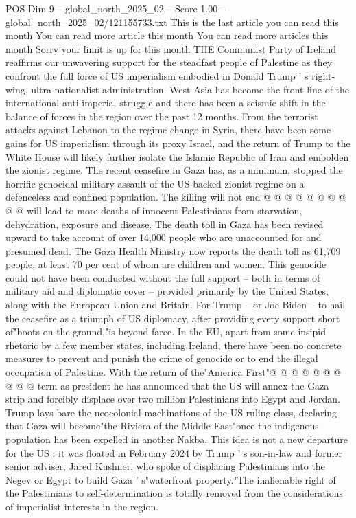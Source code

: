 \begin{textsample}{POS Dim 9 – global\_north\_2025\_02 – Score 1.00 – global\_north\_2025\_02/121155733.txt}  \label{ex:f9_pos_441}
This is the last article you can read this month You can read more article this month You can read more articles this month Sorry your limit is up for this month THE Communist Party of Ireland reaffirms our unwavering support for the steadfast people of Palestine as they confront the full force of US imperialism embodied in Donald Trump ' s right-wing, ultra-nationalist administration.
West Asia has become the front line of the international anti-imperial struggle and there has been a seismic shift in the balance of forces in the region over the past 12 months.
From the terrorist attacks against Lebanon to the regime change in Syria, there have been some gains for US imperialism through its proxy Israel, and the return of Trump to the White House will likely further isolate the Islamic Republic of Iran and embolden the zionist regime.
The recent ceasefire in Gaza has, as a minimum, stopped the horrific genocidal military assault of the US-backed zionist regime on a defenceless and confined population.
The killing will not end @ @ @ @ @ @ @ @ @ @ will lead to more deaths of innocent Palestinians from starvation, dehydration, exposure and disease.
The death toll in Gaza has been revised upward to take account of over 14,000 people who are unaccounted for and presumed dead.
The Gaza Health Ministry now reports the death toll as 61,709 people, at least 70 per cent of whom are children and women.
This genocide could not have been conducted without the full support -- both in terms of military aid and diplomatic cover -- provided primarily by the United States, along with the European Union and Britain.
For Trump -- or Joe Biden -- to hail the ceasefire as a triumph of US diplomacy, after providing every support short of"boots on the ground,"is beyond farce.
In the EU, apart from some insipid rhetoric by a few member states, including Ireland, there have been no concrete measures to prevent and punish the crime of genocide or to end the illegal occupation of Palestine.
With the return of the"America First"@ @ @ @ @ @ @ @ @ @ term as president he has announced that the US will annex the Gaza strip and forcibly displace over two million Palestinians into Egypt and Jordan.
Trump lays bare the neocolonial machinations of the US ruling class, declaring that Gaza will become"the Riviera of the Middle East"once the indigenous population has been expelled in another Nakba.
This idea is not a new departure for the US : it was floated in February 2024 by Trump ' s son-in-law and former senior adviser, Jared Kushner, who spoke of displacing Palestinians into the Negev or Egypt to build Gaza ' s"waterfront property."The inalienable right of the Palestinians to self-determination is totally removed from the considerations of imperialist interests in the region.

\end{textsample}

